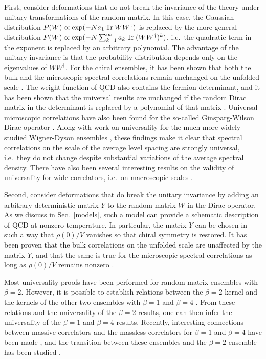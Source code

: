 First, consider deformations that do not break the invariance of the
theory under unitary transformations of the random matrix.  In this
case, the Gaussian distribution $P(W)\propto\exp(-Na_1\,{\rm Tr\:}
WW^\dagger)$ is replaced by the more general distribution
$P(W)\propto\exp(-N\sum_{k=1}^\infty a_k\,{\rm Tr\:}(WW^\dagger)^k)$, i.e.\
the quadratic term in the exponent is replaced by an arbitrary
polynomial. The advantage of the unitary invariance is that the
probability distribution depends only on the eigenvalues of
$WW^\dagger$.  For the chiral ensembles, it has been shown that both
the bulk and the microscopic spectral correlations remain unchanged on
the unfolded scale \cite{Brez96,Akem97,Kanz97,Nish98,massuni,feinrec}.
The weight function of QCD also contains the fermion determinant, and
it has been shown that the universal results are unchanged if the
random Dirac matrix in the determinant is replaced by a polynomial of
that matrix \cite{Spli99}.  Universal microscopic correlations have
also been found for the so-called Ginsparg-Wilson Dirac operator
\cite{Splittorff}.  Along with work on universality for the much
more widely studied Wigner-Dyson ensembles \cite{Bowick,AJ,Brez93,Been93,%
  Hack95,Frei96,kanuni,Kanz97,ake,hi,Zinn97,Eyna97}, these findings
make it 
clear that spectral correlations on the scale of the average
level spacing are strongly universal, i.e.\ they do not change 
despite substantial variations of the average spectral density. 
There have also been several interesting results on the
validity of universality for wide correlators, i.e.\ on macroscopic
scales \cite{AJ,Brez93,Been93,akewide}.

Second, consider deformations that do break the unitary invariance
by adding an arbitrary deterministic matrix $Y$ to the
random matrix $W$ in the Dirac operator.  As we discuss in
Sec.~\ref{models}, such a model can provide a schematic description of
QCD at nonzero temperature.  In particular, the matrix $Y$ can be
chosen in such a way that $\rho(0)/V$ vanishes so that chiral symmetry
is restored.  It has been proven that the bulk correlations on the
unfolded scale are unaffected by the matrix $Y$, and that the same is
true for the microscopic spectral correlations as long as $\rho(0)/V$
remains nonzero
\cite{senert,Jack96,Guhr97,Brez97,Seif99,paul-zinnjustin}.

Most universality proofs have been performed for random matrix
ensembles with $\beta=2$.  However, it is possible to establish
relations between the $\beta=2$ kernel and the kernels of the other
two ensembles with $\beta=1$ and $\beta=4$
\cite{Verb94,brezinneuberger,Sene98,Wido98,Klein00}.  {}From these
relations 
and the universality of the $\beta=2$ results, one can then infer the
universality of the $\beta=1$ and $\beta=4$ results. Recently,
interesting connections between massive correlators and the massless
correlators for $\beta =1$ and $\beta= 4$ have been made
\cite{akemann-kanzieper}, and the transition between these
ensembles and the $\beta=2$ ensemble has been studied
\cite{forrester14}.

